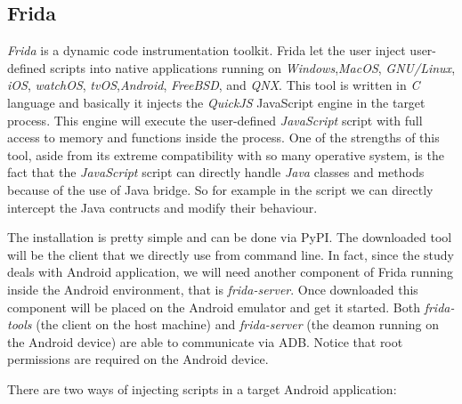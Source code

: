 		\subsection{Frida}
		\label{subsec:frida}
			\par \textit{Frida} is a dynamic code instrumentation toolkit. Frida let the user inject user-defined scripts into native applications running on \textit{Windows},\textit{MacOS}, \textit{GNU/Linux}, \textit{iOS}, \textit{watchOS}, \textit{tvOS},\textit{Android}, \textit{FreeBSD}, and \textit{QNX}. This tool is written in \textit{C} language and basically it injects the \textit{QuickJS} JavaScript engine in the target process. This engine will execute the user-defined \textit{JavaScript} script with full access to memory and functions inside the process. One of the strengths of this tool, aside from its extreme compatibility with so many operative system, is the fact that the \textit{JavaScript} script can directly handle \textit{Java} classes and methods because of the use of Java bridge. So for example in the script we can directly intercept the Java contructs and modify their behaviour. 
			\par The installation is pretty simple and can be done via PyPI. The downloaded tool will be the client that we directly use from command line. In fact, since the study deals with Android application, we will need another component of Frida running inside the Android environment, that is \textit{frida-server}. Once downloaded this component will be placed on the Android emulator and get it started. Both \textit{frida-tools} (the client on the host machine) and \textit{frida-server} (the deamon running on the Android device) are able to communicate via ADB. Notice that root permissions are required on the Android device.
			\par There are two ways of injecting scripts in a target Android application:
